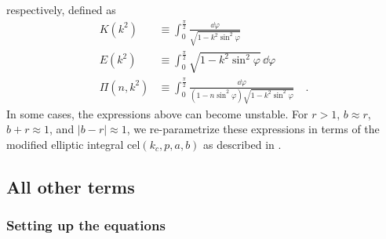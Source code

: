 \documentclass[modern]{aastex61}
\begin{document}
respectively, defined as
%
\begin{align}
    \label{eq:elliptic}
    K(k^2) &\equiv \int_0^{\frac{\pi}{2}} \frac{\dd \varphi}{\sqrt{1 - k^2 \sin^2 \varphi}}
    \nonumber \\[0.5em]
    E(k^2) &\equiv \int_0^{\frac{\pi}{2}} \sqrt{1 - k^2 \sin^2 \varphi} \, \dd \varphi
    \nonumber \\[0.5em]
    \Pi(n, k^2) &\equiv \int_0^{\frac{\pi}{2}} \frac{\dd \varphi}{(1 - n \sin^2 \varphi)\sqrt{1 - k^2 \sin^2 \varphi}}
    \quad.
\end{align}
%
In some cases, the expressions above can become unstable. For $r > 1$,
$b \approx r$, $b + r \approx 1$, and $|b - r| \approx 1$, we re-parametrize
these expressions in terms of the modified elliptic integral
$\mathrm{cel}(k_c, p, a, b)$ \citep{Bulirsch1969} as described in
\citet{limbdark}.

\subsection{All other terms}
\label{app:generalterm}

\subsubsection{Setting up the equations}
\label{app:generaltermsetup}
\end{document}
